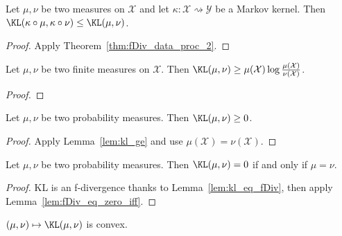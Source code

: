 \begin{theorem}
  \label{thm:kl_data_proc}
  \mathlibok
  Let $\mu, \nu$ be two measures on $\mathcal X$ and let $\kappa : \mathcal X \rightsquigarrow \mathcal Y$ be a Markov kernel.
  Then $\KL(\kappa \circ \mu, \kappa \circ \nu) \le \KL(\mu, \nu)$.
\end{theorem}

\begin{proof}\mathlibok
{}
Apply Theorem~\ref{thm:fDiv_data_proc_2}.
\end{proof}


\begin{lemma}
  \label{lem:kl_ge}
  \mathlibok
  Let $\mu, \nu$ be two finite measures on $\mathcal X$. Then $\KL(\mu, \nu) \ge \mu(\mathcal X) \log \frac{\mu(\mathcal X)}{\nu(\mathcal X)}$.
\end{lemma}

\begin{proof}\mathlibok
{}
\end{proof}


\begin{lemma}
  \label{lem:kl_nonneg}
  \leanok
  Let $\mu, \nu$ be two probability measures. Then $\KL(\mu, \nu) \ge 0$.
\end{lemma}

\begin{proof}\leanok
{}
Apply Lemma~\ref{lem:kl_ge} and use $\mu(\mathcal X) = \nu (\mathcal X)$.
\end{proof}


\begin{lemma}
  \label{lem:kl_eq_zero_iff}
  \mathlibok
  Let $\mu, \nu$ be two probability measures. Then $\KL(\mu, \nu) = 0$ if and only if $\mu = \nu$.
\end{lemma}

\begin{proof}\mathlibok
{}
KL is an f-divergence thanks to Lemma~\ref{lem:kl_eq_fDiv}, then apply Lemma~\ref{lem:fDiv_eq_zero_iff}.
\end{proof}


\begin{lemma}
  \label{lem:kl_convex}
  $(\mu, \nu) \mapsto \KL(\mu, \nu)$ is convex.
\end{lemma}

